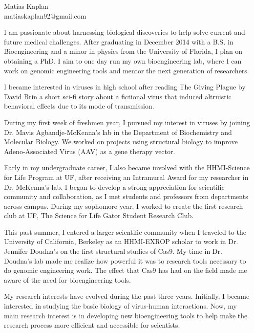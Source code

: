 \documentclass[11pt,letterpaper]{article}
\begin{document}
\noindent Matias Kaplan\\
\noindent matiaskaplan92@gmail.com\\
\medskip


\begin{flushleft}

\noindent	I am passionate about harnessing biological discoveries to help solve current and future medical challenges. After graduating in December 2014 with a B.S. in Bioengineering and a minor in physics from the University of Florida, I plan on obtaining a PhD. I aim to one day run my own bioengineering lab, where I can work on genomic engineering tools and mentor the next generation of researchers.   \\ 
\bigskip

\noindent	I became interested in viruses in high school after reading The Giving Plague by David Brin a short sci-fi story about a fictional virus that induced altruistic behavioral effects due to its mode of transmission. \\
\bigskip

\noindent During my first week of freshmen year, I pursued my interest in viruses by joining Dr. Mavis Agbandje-McKenna’s lab in the Department of Biochemistry and Molecular Biology. We worked on projects using structural biology to improve Adeno-Associated Virus (AAV) as a gene therapy vector.  \\
\bigskip

\noindent Early in my undergraduate career, I also became involved with the HHMI-Science for Life Program at UF, after receiving an Intramural Award for my researcher in Dr. McKenna’s lab. I began to develop a strong appreciation for scientific community and collaboration, as I met students and professors from departments across campus. During my sophomore year, I worked to create the first research club at UF, The Science for Life Gator Student Research Club.  \\
\bigskip

\noindent 		This past summer, I entered a larger scientific community when I traveled to the University of California, Berkeley as an HHMI-EXROP scholar to work in Dr. Jennifer Doudna’s on the first structural studies of Cas9. My time in Dr. Doudna’s lab made me realize how powerful it was to research tools necessary to do genomic engineering work. The effect that Cas9 has had on the field made me aware of the need for bioengineering tools. \\
\bigskip

\noindent My research interests have evolved during the past three years. Initially, I became interested in studying the basic biology of virus-human interactions. Now, my main research interest is in developing new bioengineering tools to help make the research process more efficient and accessible for scientists. \\
\bigskip


\end{flushleft}
\end{document}
